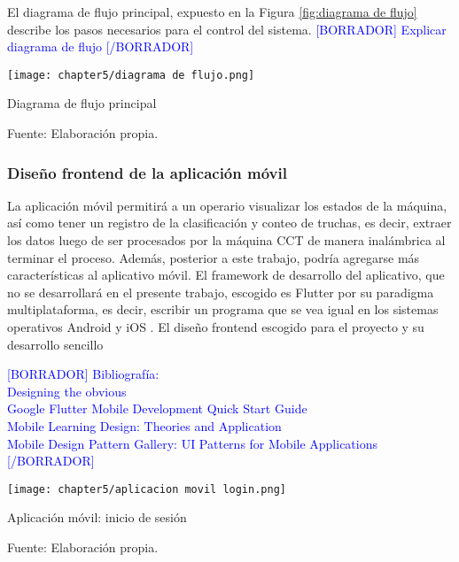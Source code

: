 El diagrama de flujo principal, expuesto en la Figura \ref{fig:diagrama de flujo} describe los pasos necesarios para el control del sistema. \textcolor{blue}{[BORRADOR] Explicar diagrama de flujo [/BORRADOR]}

\begin{myfigure}[H]
	\centering
	\texttt{[image: chapter5/diagrama de flujo.png]}
	\caption{Diagrama de flujo principal}
	\begin{myflushleftportland}
		Fuente: Elaboración propia.
	\end{myflushleftportland}
	\label{fig:diagrama de flujo}
\end{myfigure}


\subsubsection{Diseño frontend de la aplicación móvil}

La aplicación móvil permitirá a un operario visualizar los estados de la máquina, así como tener un registro de la clasificación y conteo de truchas, es decir, extraer los datos luego de ser procesados por la máquina CCT de manera inalámbrica al terminar el proceso. Además, posterior a este trabajo, podría agregarse más características al aplicativo móvil. El framework de desarrollo del aplicativo, que no se desarrollará en el presente trabajo, escogido es Flutter por su paradigma multiplataforma, es decir, escribir un programa que se vea igual en los sistemas operativos Android y iOS \cite{Simone2020}. El diseño frontend escogido para el proyecto y su desarrollo sencillo 


\textcolor{blue}{[BORRADOR] 
	Bibliografía:\\
	Designing the obvious
	\cite{Joekman2010} \\
	Google Flutter Mobile Development Quick Start Guide
	\cite{PrajyotMainkar2019} \\
	Mobile Learning Design: Theories and Application
	\cite{Churchill2016} \\
	Mobile Design Pattern Gallery: UI Patterns for Mobile Applications
	\cite{Neil2012}
	[/BORRADOR]}



\begin{myfigure}[H]
	\centering
	\texttt{[image: chapter5/aplicacion movil login.png]}
	\caption{Aplicación móvil: inicio de sesión}
	\begin{myflushleftportland}
		Fuente: Elaboración propia.
	\end{myflushleftportland}
	\label{fig:aplicacion movil login}
\end{myfigure}


